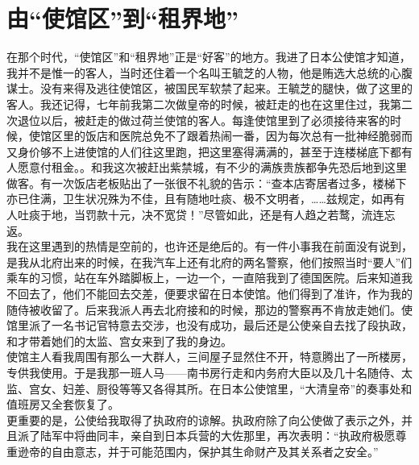 \fancyhead[RO]{} %
\fancyhead[LE]{} %
\chapter*{由“使馆区”到“租界地”}
\thispagestyle{empty}
在那个时代，“使馆区”和“租界地”正是“好客”的地方。我进了日本公使馆才知道，我并不是惟一的客人，当时还住着一个名叫王毓芝的人物，他是贿选大总统的心腹谋士。没有来得及逃往使馆区，被国民军软禁了起来。王毓芝的腿快，做了这里的客人。我还记得，七年前我第二次做皇帝的时候，被赶走的也在这里住过，我第二次退位以后，被赶走的做过荷兰使馆的客人。每逢使馆里到了必须接待来客的时候，使馆区里的饭店和医院总免不了跟着热闹一番，因为每次总有一批神经脆弱而又身价够不上进使馆的人们往这里跑，把这里塞得满满的，甚至于连楼梯底下都有人愿意付租金。。和我这次被赶出紫禁城，有不少的满族贵族都争先恐后地到这里做客。有一次饭店老板贴出了一张很不礼貌的告示：“查本店寄居者过多，楼梯下亦已住满，卫生状况殊为不佳，且有随地吐痰、极不文明者，……兹规定，如再有人吐痰于地，当罚款十元，决不宽贷！”尽管如此，还是有人趋之若鹜，流连忘返。\\

我在这里遇到的热情是空前的，也许还是绝后的。有一件小事我在前面没有说到，是我从北府出来的时候，在我汽车上还有北府的两名警察，他们按照当时“要人”们乘车的习惯，站在车外踏脚板上，一边一个，一直陪我到了德国医院。后来知道我不回去了，他们不能回去交差，便要求留在日本使馆。他们得到了准许，作为我的随侍被收留了。后来我派人再去北府接和的时候，那边的警察再不肯放走她们。使馆里派了一名书记官特意去交涉，也没有成功，最后还是公使亲自去找了段执政，和才带着她们的太监、宫女来到了我的身边。\\

使馆主人看我周围有那么一大群人，三间屋子显然住不开，特意腾出了一所楼房，专供我使用。于是我那一班人马——南书房行走和内务府大臣以及几十名随侍、太监、宫女、妇差、厨役等等又各得其所。在日本公使馆里，“大清皇帝”的奏事处和值班房又全套恢复了。\\

更重要的是，公使给我取得了执政府的谅解。执政府除了向公使做了表示之外，并且派了陆军中将曲同丰，亲自到日本兵营的大佐那里，再次表明：“执政府极愿尊重逊帝的自由意志，并于可能范围内，保护其生命财产及其关系者之安全。”\\

